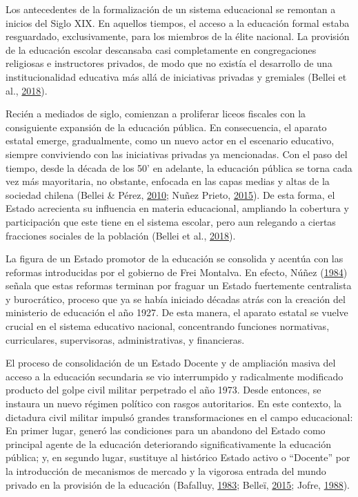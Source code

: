 \documentclass[
]{article}
\begin{document}
Los antecedentes de la formalización de un sistema educacional se
remontan a inicios del Siglo XIX. En aquellos tiempos, el acceso a la
educación formal estaba resguardado, exclusivamente, para los miembros
de la élite nacional. La provisión de la educación escolar descansaba
casi completamente en congregaciones religiosas e instructores privados,
de modo que no existía el desarrollo de una institucionalidad educativa
más allá de iniciativas privadas y gremiales (Bellei et al.,
\protect\hyperlink{ref-bellei_nueva_2018}{2018}).

Recién a mediados de siglo, comienzan a proliferar liceos fiscales con
la consiguiente expansión de la educación pública. En consecuencia, el
aparato estatal emerge, gradualmente, como un nuevo actor en el
escenario educativo, siempre conviviendo con las iniciativas privadas ya
mencionadas. Con el paso del tiempo, desde la década de los 50' en
adelante, la educación pública se torna cada vez más mayoritaria, no
obstante, enfocada en las capas medias y altas de la sociedad chilena
(Bellei \& Pérez, \protect\hyperlink{ref-bellei_conocer_2010}{2010};
Nuñez Prieto, \protect\hyperlink{ref-nunezprieto_educacion_2015}{2015}).
De esta forma, el Estado acrecienta su influencia en materia
educacional, ampliando la cobertura y participación que este tiene en el
sistema escolar, pero aun relegando a ciertas fracciones sociales de la
población (Bellei et al.,
\protect\hyperlink{ref-bellei_nueva_2018}{2018}).

La figura de un Estado promotor de la educación se consolida y acentúa
con las reformas introducidas por el gobierno de Frei Montalva. En
efecto, Núñez
(\protect\hyperlink{ref-nunez_transformaciones_1984}{1984}) señala que
estas reformas terminan por fraguar un Estado fuertemente centralista y
burocrático, proceso que ya se había iniciado décadas atrás con la
creación del ministerio de educación el año 1927. De esta manera, el
aparato estatal se vuelve crucial en el sistema educativo nacional,
concentrando funciones normativas, curriculares, supervisoras,
administrativas, y financieras.

El proceso de consolidación de un Estado Docente y de ampliación masiva
del acceso a la educación secundaria se vio interrumpido y radicalmente
modificado producto del golpe civil militar perpetrado el año 1973.
Desde entonces, se instaura un nuevo régimen político con rasgos
autoritarios. En este contexto, la dictadura civil militar impulsó
grandes transformaciones en el campo educacional: En primer lugar,
generó las condiciones para un abandono del Estado como principal agente
de la educación deteriorando significativamente la educación pública; y,
en segundo lugar, sustituye al histórico Estado activo o ``Docente'' por
la introducción de mecanismos de mercado y la vigorosa entrada del mundo
privado en la provisión de la educación (Bafalluy,
\protect\hyperlink{ref-bafalluy_modernizacion_1983}{1983}; Belleï,
\protect\hyperlink{ref-bellei_gran_2015}{2015}; Jofre,
\protect\hyperlink{ref-jofre1988sistema}{1988}).
\end{document}
